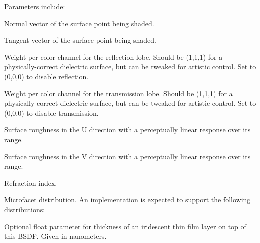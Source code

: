 \documentclass[11pt,letterpaper]{book}
\begin{document}
\noindent Parameters include:

  \vspace{12pt}
  Normal vector of the surface point being shaded.
  \apiend
  \vspace{-16pt}
  
  \vspace{12pt}
  Tangent vector of the surface point being shaded.
  \apiend
  \vspace{-16pt}
  
  \vspace{12pt}
  Weight per color channel for the reflection lobe. Should be (1,1,1) for a physically-correct dielectric surface, but can be tweaked for artistic control. Set to (0,0,0) to disable reflection.
  \apiend
  \vspace{-16pt}
  
  \vspace{12pt}
  Weight per color channel for the transmission lobe. Should be (1,1,1) for a physically-correct dielectric surface, but can be tweaked for artistic control. Set to (0,0,0) to disable transmission.
  \apiend
  \vspace{-16pt}
  
  \vspace{12pt}
  Surface roughness in the U direction with a perceptually linear response over its range.
  \apiend
  \vspace{-16pt}
  
  \vspace{12pt}
  Surface roughness in the V direction with a perceptually linear response
  over its range.
  \apiend
  \vspace{-16pt}
  
  \vspace{12pt}
  Refraction index.
  \apiend
  \vspace{-16pt}
  
  \vspace{12pt}
  Microfacet distribution. An implementation is expected to support the
  following distributions: 
  \apiend
  \vspace{-16pt}
  
  \vspace{12pt}
  Optional float parameter for thickness of an iridescent thin film layer on
  top of this BSDF. Given in nanometers.
  \apiend
  \vspace{-16pt}
  
\end{document}
